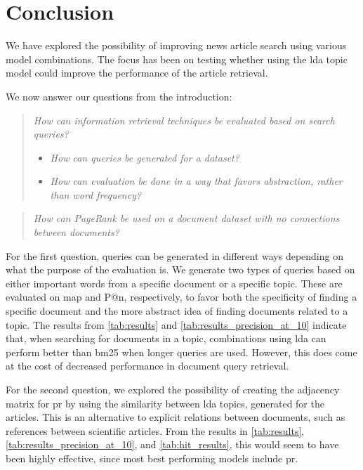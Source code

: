 \section{Conclusion}\label{sec:conclusion}
We have explored the possibility of improving news article search using various model combinations.
The focus has been on testing whether using the \gls{lda} topic model could improve the performance of the article retrieval.

We now answer our questions from the introduction:
\begin{quote}
	\emph{How can information retrieval techniques be evaluated based on search queries?}
	\begin{itemize}
		\item \emph{How can queries be generated for a dataset?}
		\item \emph{How can evaluation be done in a way that favors abstraction, rather than word frequency?}
	\end{itemize}
\end{quote}
\vspace{0.1 cm}

\begin{quote}
	\emph{How can PageRank be used on a document dataset with no connections between documents?}
\end{quote}

For the first question, queries can be generated in different ways depending on what the purpose of the evaluation is.
We generate two types of queries based on either important words from a specific document or a specific topic.
These are evaluated on \acrlong{map} and P@n, respectively, to favor both the specificity of finding a specific document and the more abstract idea of finding documents related to a topic.
The results from \autoref{tab:results} and \autoref{tab:results_precision_at_10} indicate that, when searching for documents in a topic, combinations using \gls{lda} can perform better than \gls{bm25} when longer queries are used.
However, this does come at the cost of decreased performance in document query retrieval.

For the second question, we explored the possibility of creating the adjacency matrix for \gls{pr} by using the similarity between \gls{lda} topics, generated for the articles.
This is an alternative to explicit relations between documents, such as references between scientific articles.
From the results in \autoref{tab:results}, \autoref{tab:results_precision_at_10}, and \autoref{tab:hit_results}, this would seem to have been highly effective, since most best performing models include \gls{pr}.

